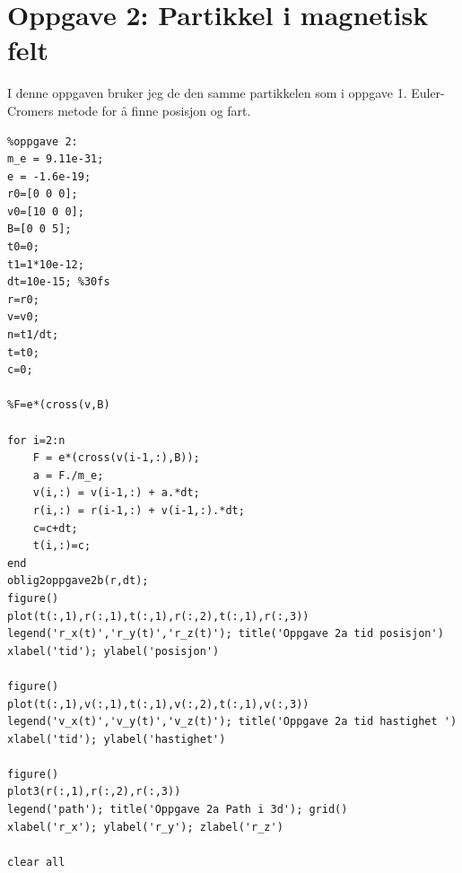 \documentclass[12pt,a4paper,final,leqno]{report}
\begin{document}
\section*{Oppgave 2: Partikkel i magnetisk felt}
I denne oppgaven bruker jeg de den samme partikkelen som i oppgave 1. Euler-Cromers metode for å finne posisjon og fart.
\begin{verbatim}
%oppgave 2:
m_e = 9.11e-31; 
e = -1.6e-19; 
r0=[0 0 0];
v0=[10 0 0];
B=[0 0 5];
t0=0;
t1=1*10e-12;
dt=10e-15; %30fs
r=r0;
v=v0;
n=t1/dt;
t=t0;
c=0;

%F=e*(cross(v,B)

for i=2:n
    F = e*(cross(v(i-1,:),B));
    a = F./m_e; 
    v(i,:) = v(i-1,:) + a.*dt;
    r(i,:) = r(i-1,:) + v(i-1,:).*dt; 
    c=c+dt;
    t(i,:)=c;
end
oblig2oppgave2b(r,dt);
figure() 
plot(t(:,1),r(:,1),t(:,1),r(:,2),t(:,1),r(:,3))  
legend('r_x(t)','r_y(t)','r_z(t)'); title('Oppgave 2a tid posisjon') 
xlabel('tid'); ylabel('posisjon') 

figure() 
plot(t(:,1),v(:,1),t(:,1),v(:,2),t(:,1),v(:,3)) 
legend('v_x(t)','v_y(t)','v_z(t)'); title('Oppgave 2a tid hastighet ') 
xlabel('tid'); ylabel('hastighet') 

figure() 
plot3(r(:,1),r(:,2),r(:,3)) 
legend('path'); title('Oppgave 2a Path i 3d'); grid() 
xlabel('r_x'); ylabel('r_y'); zlabel('r_z')

clear all

\end{verbatim}
\end{document}
